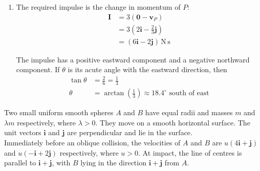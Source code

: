 \documentclass[leqno]{article}
\begin{document}
\begin{enumerate}[
  label=\textbf{\arabic*.},
  leftmargin=*,
  topsep=0pt,
  partopsep=0pt,
  parsep=0pt
]
\begin{djsSolution}
\begin{enumerate}[label=\textbf{(\alph*)}, start=1]
\item The required impulse is the change in momentum of \(P\):
\begin{align*}
\mathbf{I}&=3(\mathbf{0}-\mathbf{v}_P)\\
&=3\left(2\mathbf{i}-\frac{2}{3}\mathbf{j}\right)\\
&=(6\mathbf{i}-2\mathbf{j})\,\mathrm{N\,s}
\end{align*}

The impulse has a positive eastward component and a negative northward component. If \(\theta\) is its acute angle with the eastward direction, then
\begin{align*}
\tan\theta&=\frac{2}{6}=\frac{1}{3}\\
\theta&=\arctan\left(\frac{1}{3}\right)\approx18.4^\circ\text{ south of east}
\end{align*}

\end{enumerate}
\end{djsSolution}

\newpage

\questionitem

Two small uniform smooth spheres $A$ and $B$ have equal radii and masses $m$ and $\lambda m$ respectively, where $\lambda>0$. They move on a smooth horizontal surface. The unit vectors $\mathbf{i}$ and $\mathbf{j}$ are perpendicular and lie in the surface. \\

Immediately before an oblique collision, the velocities of $A$ and $B$ are $u(4\mathbf{i}+\mathbf{j})$ and $u(-\mathbf{i}+2\mathbf{j})$ respectively, where $u>0$. At impact, the line of centres is parallel to $\mathbf{i}+\mathbf{j}$, with $B$ lying in the direction $\mathbf{i}+\mathbf{j}$ from $A$. \\


\end{enumerate}
\end{document}
